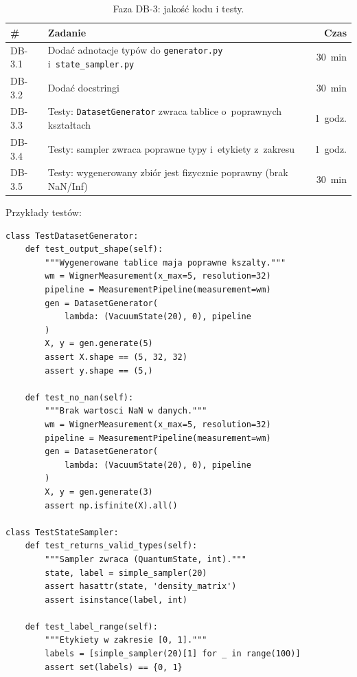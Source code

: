 \documentclass[12pt,a4paper]{article}
\begin{document}
\begin{table}[htbp]
\centering
\caption{Faza DB-3: jakość kodu i testy.}
\begin{tabular}{@{}lp{9cm}r@{}}
\toprule
\textbf{\#} & \textbf{Zadanie} & \textbf{Czas} \\
\midrule
DB-3.1 & Dodać adnotacje typów do \texttt{generator.py} i~\texttt{state\_sampler.py} & 30~min \\
DB-3.2 & Dodać docstringi & 30~min \\
DB-3.3 & Testy: \texttt{DatasetGenerator} zwraca tablice o~poprawnych kształtach & 1~godz. \\
DB-3.4 & Testy: sampler zwraca poprawne typy i~etykiety z~zakresu & 1~godz. \\
DB-3.5 & Testy: wygenerowany zbiór jest fizycznie poprawny (brak NaN/Inf) & 30~min \\
\bottomrule
\end{tabular}
\end{table}

Przykłady testów:

\begin{lstlisting}[caption={Testy dla modułu \texttt{dataset}.}, label={lst:test-dataset}]
class TestDatasetGenerator:
    def test_output_shape(self):
        """Wygenerowane tablice maja poprawne kszalty."""
        wm = WignerMeasurement(x_max=5, resolution=32)
        pipeline = MeasurementPipeline(measurement=wm)
        gen = DatasetGenerator(
            lambda: (VacuumState(20), 0), pipeline
        )
        X, y = gen.generate(5)
        assert X.shape == (5, 32, 32)
        assert y.shape == (5,)

    def test_no_nan(self):
        """Brak wartosci NaN w danych."""
        wm = WignerMeasurement(x_max=5, resolution=32)
        pipeline = MeasurementPipeline(measurement=wm)
        gen = DatasetGenerator(
            lambda: (VacuumState(20), 0), pipeline
        )
        X, y = gen.generate(3)
        assert np.isfinite(X).all()

class TestStateSampler:
    def test_returns_valid_types(self):
        """Sampler zwraca (QuantumState, int)."""
        state, label = simple_sampler(20)
        assert hasattr(state, 'density_matrix')
        assert isinstance(label, int)

    def test_label_range(self):
        """Etykiety w zakresie [0, 1]."""
        labels = [simple_sampler(20)[1] for _ in range(100)]
        assert set(labels) == {0, 1}
\end{lstlisting}
\end{document}
